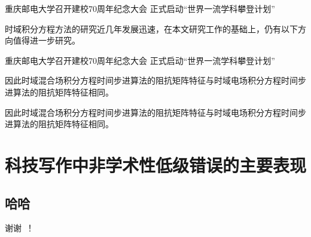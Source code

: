 \documentclass{cqupt_thesis}
\begin{document}
    重庆邮电大学召开建校70周年纪念大会 正式启动“世界一流学科攀登计划”

    \begin{corollary}
        时域积分方程方法的研究近几年发展迅速，在本文研究工作的基础上，仍有以下方向值得进一步研究。
    \end{corollary}

    重庆邮电大学召开建校70周年纪念大会 正式启动“世界一流学科攀登计划”

    \begin{lemma}[芜湖]
        因此时域混合场积分方程时间步进算法的阻抗矩阵特征与时域电场积分方程时间步进算法的阻抗矩阵特征相同。
    \end{lemma}

    \begin{lemma}
        因此时域混合场积分方程时间步进算法的阻抗矩阵特征与时域电场积分方程时间步进算法的阻抗矩阵特征相同。
    \end{lemma}





    \begin{reference}
        
    \end{reference}


    \beginappendix
    \chapter{科技写作中非学术性低级错误的主要表现}
    \section{哈哈}


    \begin{acknowledgements}
        谢谢~！
    \end{acknowledgements}
\end{document}
